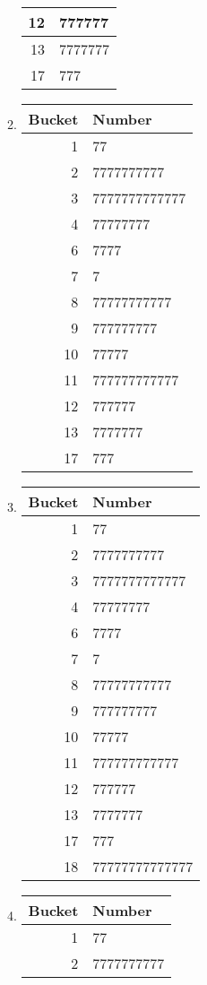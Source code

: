 \documentclass[12pt]{article}
\begin{document}
\begin{enumerate}[a]
\begin{multicols}{2}
\begin{enumerate}[1]
\begin{tabular}{r|l}
			12 & 777777\\\hline
			13 & 7777777\\\hline
			17 & 777
		\end{tabular}
		\item
		\begin{tabular}{r|l}
			Bucket & Number\\\hline\hline
			1 & 77\\\hline
			2 & 7777777777\\\hline
			3 & 7777777777777\\\hline
			4 & 77777777\\\hline
			6 & 7777\\\hline
			7 & 7\\\hline
			8 & 77777777777\\\hline
			9 & 777777777\\\hline
			10 & 77777\\\hline
			11 & 777777777777\\\hline
			12 & 777777\\\hline
			13 & 7777777\\\hline
			17 & 777
		\end{tabular}
		\item
		\begin{tabular}{r|l}
			Bucket & Number\\\hline\hline
			1 & 77\\\hline
			2 & 7777777777\\\hline
			3 & 7777777777777\\\hline
			4 & 77777777\\\hline
			6 & 7777\\\hline
			7 & 7\\\hline
			8 & 77777777777\\\hline
			9 & 777777777\\\hline
			10 & 77777\\\hline
			11 & 777777777777\\\hline
			12 & 777777\\\hline
			13 & 7777777\\\hline
			17 & 777\\\hline
			18 & 77777777777777
		\end{tabular}
		\item
		\begin{tabular}{r|l}
			Bucket & Number\\\hline\hline
			1 & 77\\\hline
			2 & 7777777777\\\hline

\end{tabular}
\end{enumerate}
\end{multicols}
\end{enumerate}
\end{document}
